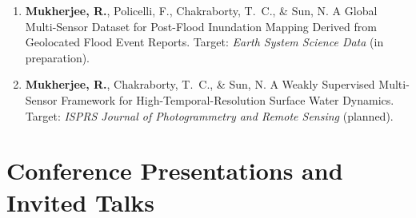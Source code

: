 \documentclass[10pt,letterpaper]{article}
\begin{document}
\begin{enumerate}[leftmargin=0.2in, itemsep=0.25em, resume]
  \item \textbf{Mukherjee, R.}, Policelli, F., Chakraborty, T.\ C., \& Sun, N.
  A Global Multi-Sensor Dataset for Post-Flood Inundation Mapping Derived from Geolocated Flood Event Reports.
  Target: \emph{Earth System Science Data} (in preparation).

  \item \textbf{Mukherjee, R.}, Chakraborty, T.\ C., \& Sun, N.
  A Weakly Supervised Multi-Sensor Framework for High-Temporal-Resolution Surface Water Dynamics.
  Target: \emph{ISPRS Journal of Photogrammetry and Remote Sensing} (planned).
\end{enumerate}
\normalsize

\section*{Conference Presentations and Invited Talks}
\end{document}
